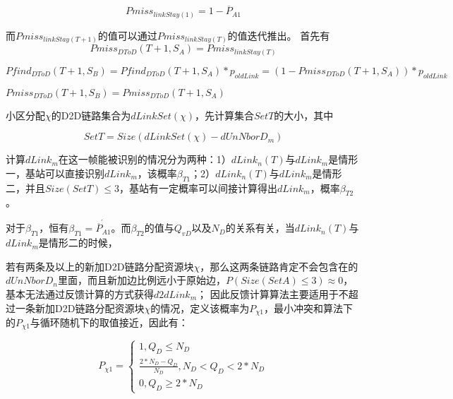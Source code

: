 \documentclass[figurelist,tablelist,algorithmlist,nomlist,masters]{seuthesix}
\begin{document}
	\begin{equation}\label{eq3.1}
	Pmiss_{linkStay(1)} = 1 - \overline P _{A1}
	\end{equation}
	
	而$Pmiss_{linkStay(T + 1)}$的值可以通过$Pmiss_{linkStay(T)}$的值迭代推出。
	首先有
	\begin{equation}\label{eq3.1}
	Pmis{s_{DToD}}(T + 1,S_A) = Pmis{s_{linkStay(T)}}
	\end{equation}
	
	\begin{equation}\label{eq3.1}
	Pfin{d_{DToD}}(T + 1,S_B) = Pfin{d_{DToD}}(T + 1,S_A)*{p_{oldLink}} = (1 - Pmis{s_{DToD}}(T + 1,S_A))*{p_{oldLink}}
	\end{equation}
	
	$Pmis{s_{DToD}}(T + 1,S_B) = Pmis{s_{DToD}}(T + 1,S_A)$
	
	
	小区分配$\chi $的D2D链路集合为$dLinkSet(\chi )$，先计算集合$SetT$的大小，其中
	
	\begin{equation}\label{eq3.1}
	SetT  = Size(dLinkSet(\chi ) - dUnNborD_m)
	\end{equation}
	
	计算$dLink_m$在这一帧能被识别的情况分为两种：1）$dLink_n(T)$与$dLink_m$是情形一，基站可以直接识别$dLink_m$，该概率$\beta _{T1}$；2）$dLink_n(T)$与$dLink_m$是情形二，并且$Size(SetT) \le 3$，基站有一定概率可以间接计算得出$dLink_m$，概率$\beta _{T2}$。
	
	对于$\beta _{T1}$，恒有$\beta _{T1} = \acute{\overline P _{A1}}$。而$\beta _{T2}$的值与$Q_{vD}$以及$N_D$的关系有关，当$dLink_n(T)$与$dLink_m$是情形二的时候，
	
	若有两条及以上的新加D2D链路分配资源块$\chi $，那么这两条链路肯定不会包含在的$dUnNborD_n$里面，而且新加边比例远小于原始边，$P(Size(SetA) \le 3) \approx 0$，基本无法通过反馈计算的方式获得$d2dLin{k_m}$；
	因此反馈计算算法主要适用于不超过一条新加D2D链路分配资源块$\chi $的情况，定义该概率为$P_{\chi 1}$，最小冲突和算法下的$P_{\chi 1}$与循环随机下的取值接近，因此有：
	
	\begin{equation}\label{eq3.1}
	P_{\chi 1} = \left\{ \begin{array}{l}
	1,Q_D \le N_D\\
	\frac{{2*N_D - Q_D}}{{N_D}},N_D < Q_D < 2*N_D\\
	0,Q_D \ge 2*N_D
	\end{array} \right.
	\end{equation}
	
\end{document}
